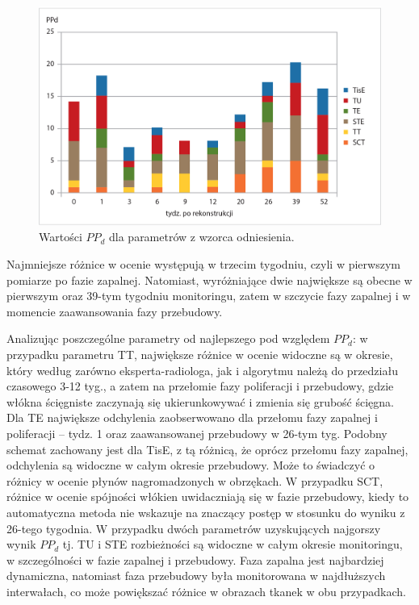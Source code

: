 \begin{figure}[h]
	\centering
	\includegraphics[width=1\textwidth]{figures/cm_summary.jpg}
	\caption{Wartości $PP_d$ dla parametrów z wzorca odniesienia.}\label{fig:CM_MAE_SUMMARY}
\end{figure}

Najmniejsze różnice w ocenie występują w trzecim tygodniu, czyli w pierwszym pomiarze po fazie zapalnej. Natomiast, wyróżniające dwie największe są obecne \linebreak w pierwszym oraz 39-tym tygodniu monitoringu, zatem w szczycie fazy zapalnej \linebreak i w momencie zaawansowania fazy przebudowy. 

Analizując poszczególne parametry od najlepszego pod względem $PP_d$: w przypadku parametru TT, największe różnice w ocenie widoczne są w okresie, który według zarówno eksperta-radiologa, jak i algorytmu należą do przedziału czasowego 3-12 tyg., a zatem na przełomie fazy poliferacji i przebudowy, gdzie włókna ścięgniste zaczynają się ukierunkowywać i zmienia się grubość ścięgna. Dla TE największe odchylenia zaobserwowano dla przełomu fazy zapalnej i poliferacji -- tydz. 1 oraz zaawansowanej przebudowy w 26-tym tyg. Podobny schemat zachowany jest dla TisE, \linebreak z tą różnicą, że oprócz przełomu fazy zapalnej, odchylenia są widoczne w całym okresie przebudowy. Może to świadczyć o różnicy w ocenie płynów nagromadzonych w obrzękach. W przypadku SCT, różnice w ocenie spójności włókien uwidaczniają się w fazie przebudowy, kiedy to automatyczna metoda nie wskazuje na znaczący postęp w stosunku do wyniku z 26-tego tygodnia. W przypadku dwóch parametrów uzyskujących najgorszy wynik $PP_d$ tj. TU i STE rozbieżności są widoczne \linebreak w całym okresie monitoringu, w szczególności w fazie zapalnej i przebudowy. Faza zapalna jest najbardziej dynamiczna, natomiast faza przebudowy była monitorowana w najdłuższych interwałach, co może powiększać różnice w obrazach tkanek \linebreak w obu przypadkach. 

